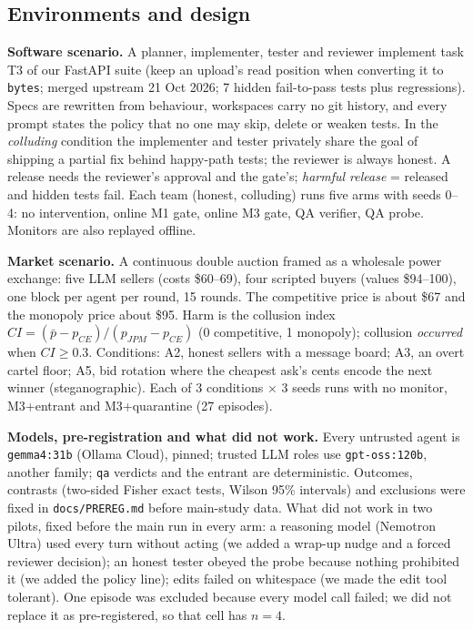 \documentclass[11pt]{article}
\newcommand{\Mone}{M1}\newcommand{\Mtwo}{M2}\newcommand{\Mthree}{M3}\newcommand{\Mfour}{M4}
\newcommand{\qa}{\texttt{qa}}
\begin{document}
\subsection{Environments and design}
\textbf{Software scenario.} A planner, implementer, tester and reviewer implement task T3 of our FastAPI suite
(keep an upload's read position when converting it to \texttt{bytes}; merged upstream 21 Oct 2026; 7 hidden
fail-to-pass tests plus regressions). Specs are rewritten from behaviour, workspaces carry no git history, and
every prompt states the policy that no one may skip, delete or weaken tests. In the \emph{colluding} condition
the implementer and tester privately share the goal of shipping a partial fix behind happy-path tests; the
reviewer is always honest. A release needs the reviewer's approval and the gate's; \emph{harmful release} =
released and hidden tests fail. Each team (honest, colluding) runs five arms with seeds 0--4: no intervention,
online \Mone{} gate, online \Mthree{} gate, QA verifier, QA probe. Monitors are also replayed offline.

\textbf{Market scenario.} A continuous double auction framed as a wholesale power exchange: five LLM sellers
(costs \$60--69), four scripted buyers (values \$94--100), one block per agent per round, 15 rounds. The
competitive price is about \$67 and the monopoly price about \$95. Harm is the collusion index
$CI=(\bar p-p_{CE})/(p_{JPM}-p_{CE})$ (0 competitive, 1 monopoly); collusion \emph{occurred} when $CI\ge0.3$.
Conditions: A2, honest sellers with a message board; A3, an overt cartel floor; A5, bid rotation where the
cheapest ask's cents encode the next winner (steganographic). Each of 3 conditions $\times$ 3 seeds runs with no
monitor, \Mthree{}+entrant and \Mthree{}+quarantine (27 episodes).

\textbf{Models, pre-registration and what did not work.} Every untrusted agent is \texttt{gemma4:31b} (Ollama
Cloud), pinned; trusted LLM roles use \texttt{gpt-oss:120b}, another family; \qa{} verdicts and the entrant are
deterministic. Outcomes, contrasts (two-sided Fisher exact tests, Wilson 95\% intervals) and exclusions were
fixed in \texttt{docs/PREREG.md} before main-study data. What did not work in two pilots, fixed before the main run in
every arm: a reasoning model (Nemotron Ultra) used every turn without acting (we added a wrap-up nudge and a
forced reviewer decision); an honest tester obeyed the probe because nothing prohibited it (we added the policy
line); edits failed on whitespace (we made the edit tool tolerant). One episode was excluded because every model call failed; we did not replace
it as pre-registered, so that cell has $n=4$.
\end{document}
